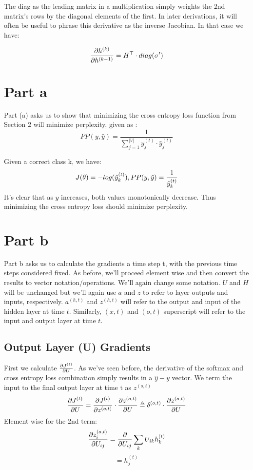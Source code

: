\documentclass[]{article}
\newcommand{\deriv}[2]{%
	\ensuremath{\frac{\partial {#1}}{\partial {#2}}}}
\newcommand{\slayer}[3]{ %
	\ensuremath{{#1}^{(#2)}_{#3}}}
\newcommand{\vlayer}[2]{ %
	\ensuremath{{#1}^{(#2)}}}
\begin{document}
The diag as the leading matrix in a multiplication simply weights the 2nd matrix's rows by the diagonal elements of the first. In later derivations, it will often be useful to phrase this derivative as the inverse Jacobian. In that case we have:

$$\deriv{\vlayer{h}{k}}{\vlayer{h}{k-1}} = H^\top \cdot diag(\sigma')$$

\section{Part a}
Part (a) asks us to show that minimizing the cross entropy loss function from Section 2 will minimize perplexity, given as :
$$ PP(y, \hat{y}) = \frac{1}{\sum_{j=1}^{|V|}\slayer{y}{t}{j}\cdot\slayer{\hat{y}}{t}{j}}$$

Given a correct class k, we have:
$$J(\theta) = -log(\slayer{\hat{y}}{t}{k}) , PP(y, \hat{y}) = \frac{1}{\slayer{\hat{y}}{t}{k}} $$
It's clear that as $\hat{y}$ increases, both values monotonically decrease. Thus minimizing the cross entropy loss should minimize perplexity. 

\section{Part b}
Part b asks us to calculate the gradients a time step t, with the previous time steps considered fixed. As before, we'll proceed element wise and then convert the results to vector notation/operations. We'll again change some notation. $U$ and $H$ will be unchanged but we'll again use $a$ and $z$ to refer to layer outputs and inputs, respectively.\vlayer{a}{h,t} and\vlayer{z}{h,t} will refer to the output and input of the hidden layer at time $t$. Similarly, $(x,t)$ and $(o,t)$ superscript will refer to the input and output layer at time $t$.

\subsection{Output Layer (U) Gradients}
First we calculate $\deriv{\vlayer{J}{t}}{U}$. As we've seen before, the derivative of the softmax and cross entropy loss combination simply results in a $\hat{y} - y$ vector. We term the input to the final output layer at time t as\vlayer{z}{o,t}
$$\deriv{\vlayer{J}{t}}{U} = \deriv{\vlayer{J}{t}}{\vlayer{z}{o,t}}\cdot\deriv{\vlayer{z}{o,t}}{U} \triangleq\vlayer{\delta}{o,t}\cdot\deriv{\vlayer{z}{o,t}}{U}$$
Element wise for the 2nd term:
$$ \deriv{\slayer{z}{o,t}{i}}{U_{ij}} = \deriv{}{U_{ij}} \sum_{k} U_{ik}\slayer{h}{t}{k}$$
$$ = \slayer{h}{t}{j}$$
\end{document}
